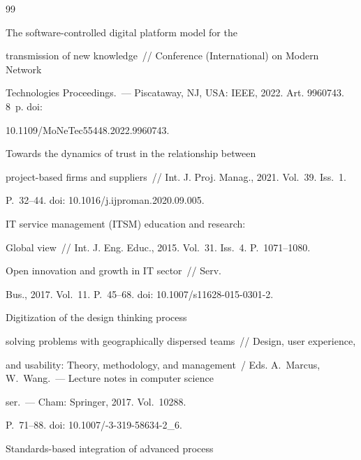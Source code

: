 {\small\frenchspacing

{%


\begin{thebibliography}{99}


 The software-controlled digital platform model for the 

transmission of new knowledge~/\!\!/  Conference (International) on Modern Network 

Technologies Proceedings.~--- Piscataway, NJ, USA: IEEE, 2022. Art. 9960743. 8~p. doi: 

10.1109\!/\!MoNeTec55448.2022.9960743.


 Towards the dynamics of trust in the relationship between  

project-based firms and suppliers~/\!\!/ Int. J. Proj. Manag., 2021. Vol.~39. Iss.~1.  

P.~32--44. doi: 10.1016\!/\!j.ijproman.2020.09.005.


 IT service management (ITSM) education and research: 

Global view~/\!\!/ Int. J. Eng. Educ., 2015. Vol.~31. Iss.~4. P.~1071--1080.


 Open innovation and growth in IT sector~/\!\!/ Serv. 

Bus., 2017. Vol.~11. P.~45--68. doi: 10.1007\!/\!s11628-015-0301-2.


 Digitization of the design thinking process 

solving problems with geographically dispersed teams~/\!\!/ Design, user experience, 

and usability: Theory, methodology, and management~/ Eds. A.~Marcus, W.~Wang.~--- Lecture notes in computer science 

ser.~--- Cham: Springer, 2017. Vol.~10288.  

P.~71--88. doi: 10.1007\!/-3-319-58634-2\_6.


 Standards-based integration of advanced process 


\end{thebibliography}}}
